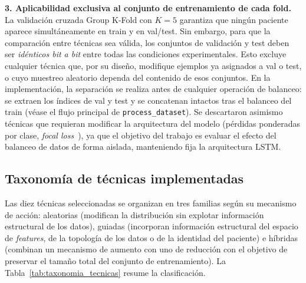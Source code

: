 \textbf{3. Aplicabilidad exclusiva al conjunto de entrenamiento de cada fold.} La validación cruzada Group K-Fold con $K=5$ garantiza que ningún paciente aparece simultáneamente en train y en val/test. Sin embargo, para que la comparación entre técnicas sea válida, los conjuntos de validación y test deben ser \emph{idénticos bit a bit} entre todas las condiciones experimentales. Esto excluye cualquier técnica que, por su diseño, modifique ejemplos ya asignados a val o test, o cuyo muestreo aleatorio dependa del contenido de esos conjuntos. En la implementación, la separación se realiza antes de cualquier operación de balanceo: se extraen los índices de val y test y se concatenan intactos tras el balanceo del train (véase el flujo principal de \texttt{process\_dataset}). Se descartaron asimismo técnicas que requieran modificar la arquitectura del modelo (pérdidas ponderadas por clase, \emph{focal loss}~\cite{lin2017focal}), ya que el objetivo del trabajo es evaluar el efecto del balanceo de datos de forma aislada, manteniendo fija la arquitectura LSTM.

\subsection{Taxonomía de técnicas implementadas}
\label{subsec:taxonomia_tecnicas}

Las diez técnicas seleccionadas se organizan en tres familias según su mecanismo de acción:
aleatorias (modifican la distribución sin explotar información estructural de los datos),
guiadas (incorporan información estructural del espacio de \textit{features}, de la
topología de los datos o de la identidad del paciente) e híbridas (combinan un mecanismo
de aumento con uno de reducción con el objetivo de preservar el tamaño total del conjunto
de entrenamiento). La Tabla~\ref{tab:taxonomia_tecnicas} resume la clasificación.

